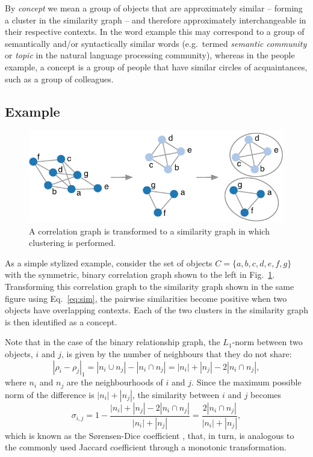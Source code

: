 \documentclass{kais}
\newcommand{\rn}[1]{\rho_{#1}}
\newcommand{\sy}[1]{\sigma_{#1}}
\newcommand{\dnm}[2]{|\rn{#1}-\rn{#2}|_1}
\begin{document}
By \emph{concept} we mean a group of objects that are approximately similar -- forming a cluster in 
the similarity graph -- and therefore approximately interchangeable in their respective contexts. In the word example 
this may correspond to a group of semantically and/or syntactically similar words (e.g.\ termed \emph{semantic community} 
or \emph{topic} in the natural language processing community), whereas in the people example, a concept is a group of 
people that have similar circles of acquaintances, such as a group of colleagues.

\subsection{Example}

\begin{figure}
\centerline{\includegraphics[width=0.65\columnwidth]{figures/examplegraphs.pdf}}
\caption{A correlation graph is transformed to a similarity graph in which clustering is performed.}
\label{fig:examplegraphs}
\end{figure}

As a simple stylized example, consider the set of objects $C = \{a,b,c,d,e,f,g\}$ with the symmetric, binary correlation 
graph shown to the left in Fig.\ \ref{fig:examplegraphs}. Transforming this correlation graph to the similarity graph shown in 
the same figure using Eq.\ \ref{eq:sim}, the pairwise similarities become positive when two objects have overlapping contexts. 
Each of the two clusters in the similarity graph is then identified as a concept.

Note that in the case of the binary relationship graph, the $L_1$-norm between two objects, $i$ and $j$, is given by the 
number of neighbours that they do not share:
\begin{equation}
\dnm{i}{j} = |n_i \cup n_j| - |n_i \cap n_j| = |n_i| + |n_j| - 2 |n_i \cap n_j|,
\label{eq:binarynorm}
\end{equation}
where $n_i$ and $n_j$ are the neighbourhoods of $i$ and $j$. Since the maximum possible norm of the difference is $|n_i| + |n_j|$, 
the similarity between $i$ and $j$ becomes
\begin{equation}
\sy{i,j} = 1 - \frac{|n_i| + |n_j| - 2 |n_i \cap n_j|}{|n_i| + |n_j|} = \frac{2 |n_i \cap n_j|}{|n_i| + |n_j|},
\label{eq:binaryrelnorm}
\end{equation}
which is known as the S{\o}rensen-Dice coefficient \cite{Dice45,Sorensen48}, that, in turn, is analogous to the commonly 
used Jaccard coefficient \cite{Jaccard1912} through a monotonic transformation.
\end{document}
